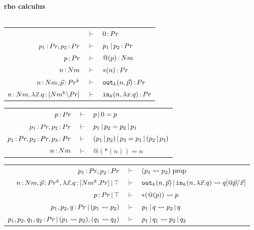 \documentclass{article}
\begin{document}
\begin{mdframed}
\begin{center}
    \textbf{rho calculus}\\~\\
    \renewcommand{\arraystretch}{1.2}

    \begin{tabular}{rcl}
        & $\vdash$ & $0\,{:}\, Pr$\\
        $p_1\,{:}\, Pr, p_2\,{:}\, Pr$ & $\vdash$ & $p_1\,|\, p_2\,{:}\, Pr$\\
        $p\,{:}\, Pr$ & $\vdash$ & $@(p)\,{:}\, Nm$\\
        $n\,{:}\, Nm$ & $\vdash$ & $\ast(n)\,{:}\, Pr$\\
        $n\,{:}\, Nm,\vec{p}\,{:}\, Pr^k$ & $\vdash$ & $\mathtt{out}_k(n,\vec{p})\,{:}\, Pr$\\
        $n\,{:}\, Nm, \lambda \vec{x}.q\,{:}\, [Nm^k{\setminus} Pr]$ & $\vdash$ & $\mathtt{in}_k(n,\lambda x.q)\,{:}\, Pr$
    \end{tabular}

    \vspace{1em}

    \begin{tabular}{rcl}
         $p\,{:}\, Pr$ & $\vdash$ & $p\,|\, 0 = p$\\
        $p_1\,{:}\, Pr, p_2\,{:}\, Pr$ & $\vdash$ & $p_1\,|\, p_2 = p_2\,|\, p_1$\\
        $p_1\,{:}\, Pr,p_2\,{:}\, Pr,p_3\,{:}\, Pr$ & $\vdash$ & $(p_1\,|\, p_2)\,|\, p_3 = p_1\,|\, (p_2\,|\, p_3)$\\
        $n\,{:}\, Nm$ & $\vdash$ & $@(\ast(n)) = n$
    \end{tabular}

    \vspace{1em}

    \begin{tabular}{rcl}
         $p_1\,{:}\, Pr,p_2\,{:}\, Pr$ & $\vdash$ & $(p_1\rightsquigarrow p_2)\; \mathrm{prop}$\\
         $n\,{:}\, Nm,\vec{p}\,{:}\, Pr^k, \lambda \vec{x}.q\,{:}\, [Nm^k.Pr]\,|\, \top$ & $\vdash$ & $\mathtt{out}_k(n,\vec{p})\,|\, \mathtt{in}_k(n,\lambda \vec{x}.q)\rightsquigarrow  q[@\vec{p}/\vec{x}]$\\
         $p\,{:}\, Pr \,|\, \top$ & $\vdash$ & $\ast(@(p))\rightsquigarrow p$\\
         $p_1,p_2,q\,{:}\, Pr\,|\, (p_1\rightsquigarrow p_2)$ & $\vdash$ & $ p_1\,|\, q\rightsquigarrow  p_2\,|\, q$\\
         $p_1,p_2,q_1,q_2\,{:}\, Pr\,|\, (p_1\rightsquigarrow p_2), (q_1\rightsquigarrow q_2)$ & $\vdash$ & $p_1\,|\, q_1\rightsquigarrow p_2\,|\, q_2$
    \end{tabular}
\end{center}
\end{mdframed}
\end{document}
